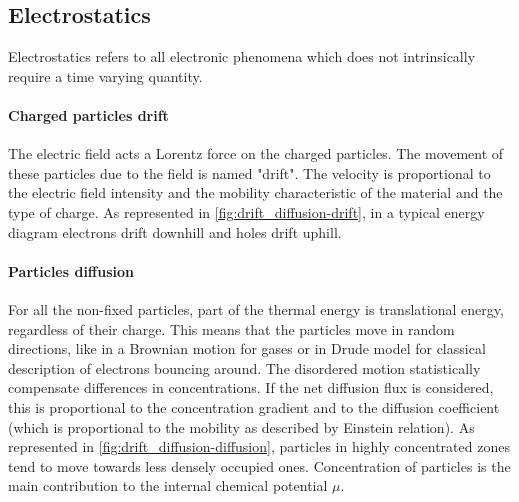 \subsection{Electrostatics}
Electrostatics refers to all electronic phenomena which does not intrinsically require a time varying quantity.


\begin{figure}
\end{figure}

		\paragraph{Charged particles drift}\label{intro_drift}
		The electric field acts a Lorentz force on the charged particles.
		The movement of these particles due to the field is named "drift".
		The velocity is proportional to the electric field intensity and the mobility characteristic of the material and the type of charge.
		As represented in \cref{fig:drift_diffusion-drift}, in a typical energy diagram electrons drift downhill and holes drift uphill.

\paragraph{Particles diffusion}\label{intro_diffusion}
For all the non-fixed particles, part of the thermal energy is translational energy, regardless of their charge.
This means that the particles move in random directions, like in a Brownian motion for gases or in Drude model for classical description of electrons bouncing around.
The disordered motion statistically compensate differences in concentrations.
If the net diffusion flux is considered, this is proportional to the concentration gradient and to the diffusion coefficient (which is proportional to the mobility as described by Einstein relation).
As represented in \cref{fig:drift_diffusion-diffusion}, particles in highly concentrated zones tend to move towards less densely occupied ones.
Concentration of particles is the main contribution to the internal chemical potential $\mu$.

